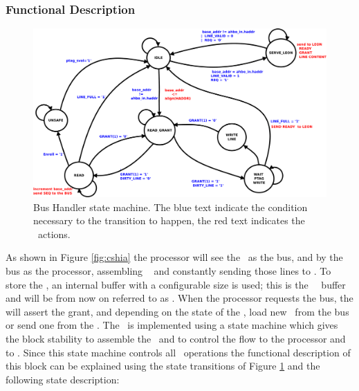 \subsubsection{Functional Description}

\begin{figure}[!ht]
	\centering
	\includegraphics[scale=0.25]{figures/pdf/sec_hand_state_machine.pdf}
    \caption{Bus Handler state machine. The blue text indicate the condition necessary to the transition to happen, the red text indicates the \handler~actions.   }
	\label{fig:phsm}
\end{figure}

As shown in Figure \ref{fig:cshia} the processor will see the \handler~as the bus, and by the bus as the processor, assembling \slines~ and constantly sending those lines to \seceng.  To store the \slines, an internal buffer with a configurable size is used; this is the \handler~\sline~buffer and will be from now on referred to as \sbuf.  When the processor requests the bus, the \handler  will assert the grant, and depending on the state of the \sbuf, load new \slines~from the bus or send one from the \sbuf. The \handler~is implemented using a state machine which gives the block stability to assemble the \sline~and to control the flow to the processor and to \seceng. Since this state machine controls all \handler~operations the functional  description of this block can be explained using the state transitions  of Figure \ref{fig:phsm} and the following state description:

